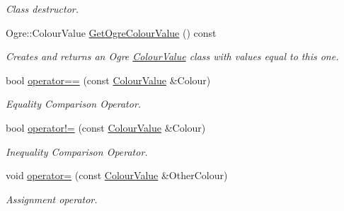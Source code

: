 \begin{DoxyCompactItemize}
\begin{DoxyCompactList}\small\item\em Class destructor. \item\end{DoxyCompactList}\item 
Ogre::ColourValue \hyperlink{classphys_1_1ColourValue_a025ed32506fe3df9e360dc00f3fb4898}{GetOgreColourValue} () const 
\begin{DoxyCompactList}\small\item\em Creates and returns an Ogre \hyperlink{classphys_1_1ColourValue}{ColourValue} class with values equal to this one. \item\end{DoxyCompactList}\item 
bool \hyperlink{classphys_1_1ColourValue_a4615835cadb51c814ef87377ac2fbc8c}{operator==} (const \hyperlink{classphys_1_1ColourValue}{ColourValue} \&Colour)
\begin{DoxyCompactList}\small\item\em Equality Comparison Operator. \item\end{DoxyCompactList}\item 
bool \hyperlink{classphys_1_1ColourValue_a06b52ce51b723ea733f2b067b03530a5}{operator!=} (const \hyperlink{classphys_1_1ColourValue}{ColourValue} \&Colour)
\begin{DoxyCompactList}\small\item\em Inequality Comparison Operator. \item\end{DoxyCompactList}\item 
void \hyperlink{classphys_1_1ColourValue_af6df730e4a222be3caeca83db91a56ec}{operator=} (const \hyperlink{classphys_1_1ColourValue}{ColourValue} \&OtherColour)
\begin{DoxyCompactList}\small\item\em Assignment operator. \item\end{DoxyCompactList}\end{DoxyCompactItemize}
